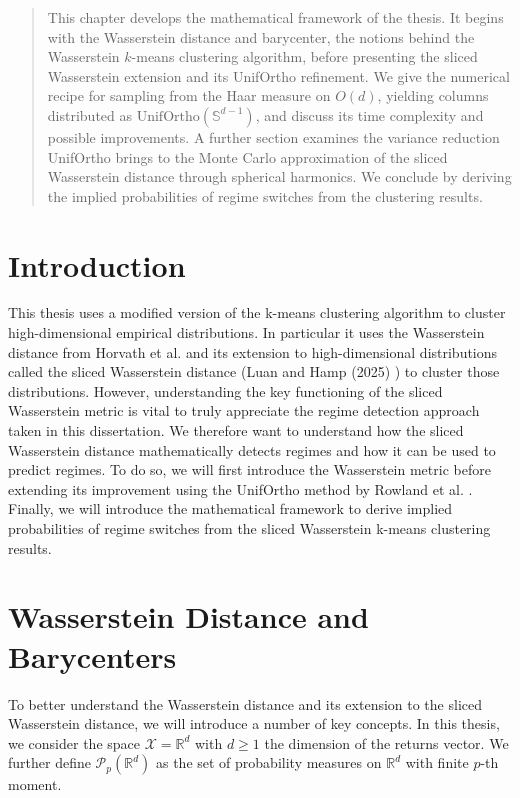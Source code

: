 \documentclass[12pt,a4paper]{report}
\begin{document}
\begin{quote}
This chapter develops the mathematical framework of the thesis. It begins with the
Wasserstein distance and barycenter, the notions behind the Wasserstein $k$-means
clustering algorithm, before presenting the sliced Wasserstein extension and its
UnifOrtho refinement. We give the numerical recipe for sampling from the Haar
measure on $O(d)$, yielding columns distributed as $\text{UnifOrtho}(\mathbb{S}^{d-1})$,
and discuss its time complexity and possible improvements. A further section
examines the variance reduction UnifOrtho brings to the Monte Carlo approximation
of the sliced Wasserstein distance through spherical harmonics. We conclude by
deriving the implied probabilities of regime switches from the clustering results.
\end{quote}


\section{Introduction}
This thesis uses a modified version of the k-means clustering algorithm to cluster high-dimensional empirical distributions.
In particular it uses the Wasserstein distance from Horvath et al. \cite{HorvathEtAl2024} and its extension to high-dimensional distributions called the sliced Wasserstein distance (Luan and Hamp (2025) \cite{LuanHamp2025})  to cluster those distributions.
However, understanding the key functioning of the sliced Wasserstein metric is vital to truly appreciate the regime detection approach taken in this dissertation.
We therefore want to understand how the sliced Wasserstein distance mathematically detects regimes and how it can be used to predict regimes.
To do so, we will first introduce the Wasserstein metric before extending its improvement using the UnifOrtho method by Rowland et al. \cite{RowlandEtAl2019}.
Finally, we will introduce the mathematical framework to derive implied probabilities of regime switches from the sliced Wasserstein k-means clustering results.


\section{Wasserstein Distance and Barycenters}
To better understand the Wasserstein distance and its extension to the sliced Wasserstein distance, we 
will introduce a number of key concepts. In this thesis, we consider the space $\mathcal{X} = \mathbb{R}^d$ with $d\geq 1 $ the dimension of the returns vector. 
We further define $\mathcal{P}_p(\mathbb{R}^d)$ as the set of probability measures on $\mathbb{R}^d$ with finite $p$-th moment. \cite{LuanHamp2025}
\end{document}
